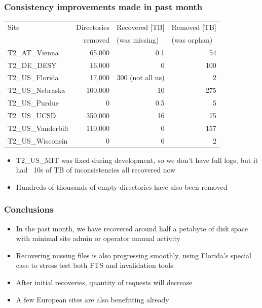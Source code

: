 \documentclass{beamer}
\begin{document}
\begin{frame}
  \frametitle{Consistency improvements made in past month}

  \centering
  {\scriptsize
    \begin{tabular}{l | r | r | r}
      \hline
      Site & Directories & \multicolumn{1}{l|}{Recovered [TB]} & \multicolumn{1}{l}{Removed [TB]} \\
      & removed & \multicolumn{1}{l|}{(was missing)} & \multicolumn{1}{l}{(was orphan)} \\
      \hline
      T2\_AT\_Vienna & 65,000 & 0.1 & 54 \\
      T2\_DE\_DESY & 16,000 & 0 & 100 \\
      T2\_US\_Florida & 17,000 & 300 (not all us) & 2 \\
      \hline
      T2\_US\_Nebraska & 100,000 & 10 & 275 \\
      T2\_US\_Purdue & 0 & 0.5 & 5 \\
      \hline
      T2\_US\_UCSD & 350,000 & 16 & 75 \\
      T2\_US\_Vanderbilt & 110,000 & 0 & 157 \\
      T2\_US\_Wisconsin & 0 & 0 & 2 \\
      \hline
    \end{tabular}
  }

  \vspace{8pt}
  \begin{itemize}
  \item T2\_US\_MIT was fixed during development, so we don't have full logs,
    but it had ~10s of TB of inconsistencies all recovered now
  \item Hundreds of thousands of empty directories have also been removed
  \end{itemize}

\end{frame}

\begin{frame}
  \frametitle{Conclusions}

  \begin{itemize}
  \item In the past month, we have recovered around half a petabyte of disk space
    with minimal site admin or operator manual activity
  \item Recovering missing files is also progressing smoothly,
    using Florida's special case to stress test both FTS and invalidation tools
  \item After initial recoveries, quantity of requests will decrease
  \item A few European sites are also benefitting already
  \end{itemize}

\end{frame}
\end{document}
